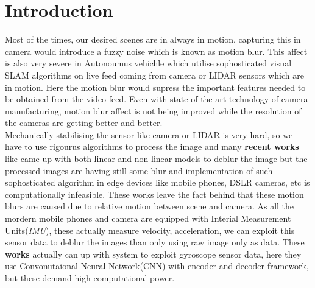\documentclass[10pt,twocolumn,letterpaper]{article}
\begin{document}
\section{Introduction}
\label{sec:intro}
%
Most of the times, our desired scenes are in always in motion, capturing this in camera would introduce a fuzzy noise which is known as motion blur. This affect is also very severe in Autonoumus vehichle which utilise sophosticated visual SLAM algorithms on live feed coming from camera or LIDAR sensors which are in motion. Here the motion blur would supress the important features needed to be obtained from the video feed. Even with state-of-the-art technology of camera manufacturing, motion blur affect is not being improved while the resolution of the cameras are getting better and better.\\

Mechanically stabilising the sensor like camera or LIDAR is very hard, so we have to use rigourus algorithms to process the image and many \textbf{recent works} like {} came up with both linear and non-linear models to deblur the image but the processed images are having still some blur and implementation of such sophosticated algorithm in edge devices like mobile phones, DSLR cameras, etc is computationally infeasible. These works leave the fact behind that these motion blurs are caused due to relative motion between scene and camera. As all the mordern mobile phones and camera are equipped with Interial Measurement Units(\textit{IMU}), these actually measure velocity, acceleration, we can exploit this sensor data to deblur the images than only using raw image only as data. These \textbf{works} actually can up with system to exploit gyroscope sensor data, here they use Convonutaional Neural Network(CNN) with encoder and decoder framework, but these demand high computational power.\\
\end{document}
